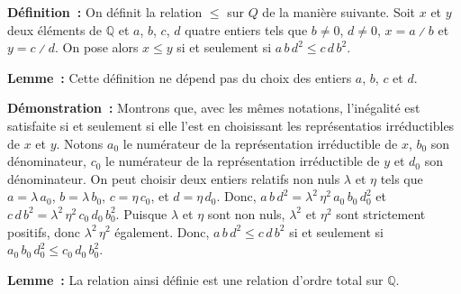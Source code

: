 \noindent\textbf{Définition :} On définit la relation $\leq$ sur $Q$ de la manière suivante. 
    Soit $x$ et $y$ deux éléments de $\mathbb{Q}$ et $a$, $b$, $c$, $d$ quatre entiers tels que $b \neq 0$, $d \neq 0$, $x = a \divslash b$ et $y = c \divslash d$.
    On pose alors $x \leq y$ si et seulement si $a \, b \, d^2 \leq c \, d \, b^2$.

\medskip

\noindent\textbf{Lemme :} Cette définition ne dépend pas du choix des entiers $a$, $b$, $c$ et $d$.

\medskip

\noindent\textbf{Démonstration :} 
    Montrons que, avec les mêmes notations, l'inégalité est satisfaite si et seulement si elle l'est en choisissant les représentatios irréductibles de $x$ et $y$.
    Notons $a_0$ le numérateur de la représentation irréductible de $x$, $b_0$ son dénominateur, $c_0$ le numérateur de la représentation irréductible de $y$ et $d_0$ son dénominateur.
    On peut choisir deux entiers relatifs non nuls $\lambda$ et $\eta$ tels que $a = \lambda \, a_0$, $b = \lambda \, b_0$, $c = \eta \, c_0$, et $d = \eta \, d_0$.
    Donc, $a \, b \, d^2 = \lambda^2 \, \eta^2 \, a_0 \, b_0 \, d_0^2$ et $c \, d \, b^2 = \lambda^2 \, \eta^2 \, c_0 \, d_0 \, b_0^2$.
    Puisque $\lambda$ et $\eta$ sont non nuls, $\lambda^2$ et $\eta^2$ sont strictement positifs, donc $\lambda^2 \, \eta^2$ également.
    Donc, $a \, b \, d^2 \leq c \, d \, b^2$ si et seulement si $a_0 \, b_0 \, d_0^2 \leq c_0 \, d_0 \, b_0^2$.
    
    \done

\medskip

\noindent\textbf{Lemme :} La relation ainsi définie est une relation d'ordre total sur $\mathbb{Q}$.

\medskip

